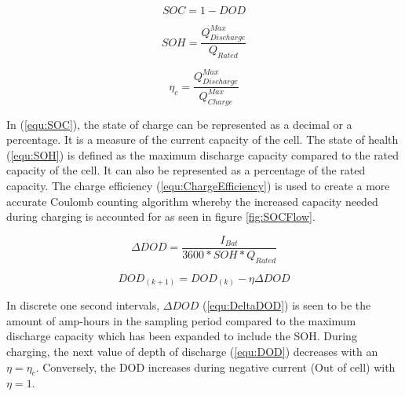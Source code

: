 \documentclass[10pt,twoside]{article}
\begin{document}
\noindent\begin{minipage}{.32\linewidth}
\begin{equation}
    SOC = 1 - DOD
  \label{equ:SOC}
\end{equation}
\end{minipage}
\begin{minipage}{.32\linewidth}
\begin{equation}
    SOH = \frac{Q_{Discharge}^{Max}}{Q_{Rated}}
  \label{equ:SOH}
\end{equation}
\end{minipage}
\begin{minipage}{.32\linewidth}
\begin{equation}
    \eta_c = \frac{Q_{Discharge}^{Max}}{Q_{Charge}^{Max}}
  \label{equ:ChargeEfficiency}
\end{equation}
\end{minipage}

In (\ref{equ:SOC}), the state of charge can be represented as a decimal or a percentage. It is a measure of the current capacity of the cell. The state of health (\ref{equ:SOH}) is defined as the maximum discharge capacity compared to the rated capacity of the cell. It can also be represented as a percentage of the rated capacity. The charge efficiency (\ref{equ:ChargeEfficiency}) is used to create a more accurate Coulomb counting algorithm whereby the increased capacity needed during charging is accounted for as seen in figure \ref{fig:SOCFlow}.   

\noindent\begin{minipage}{.49\linewidth}
\begin{equation}
    \Delta DOD = \frac{I_{Bat}}{3600*SOH*Q_{Rated}}
  \label{equ:DeltaDOD}
\end{equation}
\end{minipage}
\begin{minipage}{.49\linewidth}
\begin{equation}
    DOD_{(k+1)} = DOD_{(k)} - \eta\Delta DOD
  \label{equ:DOD}
\end{equation}
\end{minipage}

In discrete one second intervals, $\Delta DOD$ (\ref{equ:DeltaDOD}) is seen to be the amount of amp-hours in the sampling period compared to the maximum discharge capacity which has been expanded to include the SOH. During charging, the next value of depth of discharge (\ref{equ:DOD}) decreases with an $\eta = \eta_c$. Conversely, the DOD increases during negative current (Out of cell) with $\eta=1$.
\end{document}
